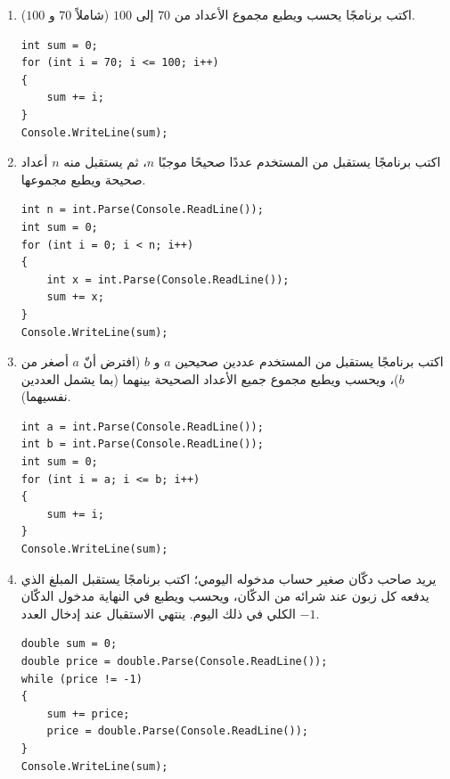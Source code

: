 \documentclass[14pt]{extarticle}
\begin{document}
\begin{enumerate}[resume, itemsep=1em]

\item اكتب برنامجًا يحسب ويطبع مجموع الأعداد من $70$ إلى $100$ (شاملاً $70$ و $100$).
\ifwithsols
\begin{boxSolution}
\begin{english}
\begin{verbatim}
int sum = 0;
for (int i = 70; i <= 100; i++)
{
    sum += i;
}
Console.WriteLine(sum);
\end{verbatim}
\end{english}
\end{boxSolution}
\fi
\filbreak

\item اكتب برنامجًا يستقبل من المستخدم عددًا صحيحًا موجبًا $n$، ثم يستقبل منه $n$ أعداد صحيحة ويطبع مجموعها.
\ifwithsols
\begin{boxSolution}
\begin{english}
\begin{verbatim}
int n = int.Parse(Console.ReadLine());
int sum = 0;
for (int i = 0; i < n; i++)
{
    int x = int.Parse(Console.ReadLine());
    sum += x;
}
Console.WriteLine(sum);
\end{verbatim}
\end{english}
\end{boxSolution}
\fi
\filbreak

\item اكتب برنامجًا يستقبل من المستخدم عددين صحيحين $a$ و $b$ (افترض أنّ $a$ أصغر من $b$)، ويحسب ويطبع مجموع جميع الأعداد الصحيحة بينهما (بما يشمل العددين نفسيهما).
\ifwithsols
\begin{boxSolution}
\begin{english}
\begin{verbatim}
int a = int.Parse(Console.ReadLine());
int b = int.Parse(Console.ReadLine());
int sum = 0;
for (int i = a; i <= b; i++)
{
    sum += i;
}
Console.WriteLine(sum);
\end{verbatim}
\end{english}
\end{boxSolution}
\fi
\filbreak

\item يريد صاحب دكّان صغير حساب مدخوله اليومي؛ اكتب برنامجًا يستقبل المبلغ الذي يدفعه كل زبون عند شرائه من الدكّان، ويحسب ويطبع في النهاية مدخول الدكّان الكلي في ذلك اليوم. ينتهي الاستقبال عند إدخال العدد $-1$.
\ifwithsols
\begin{boxSolution}
\begin{english}
\begin{verbatim}
double sum = 0;
double price = double.Parse(Console.ReadLine());
while (price != -1)
{
    sum += price;
    price = double.Parse(Console.ReadLine());
}
Console.WriteLine(sum);
\end{verbatim}
\end{english}
\end{boxSolution}
\fi
\filbreak


\end{enumerate}
\end{document}
